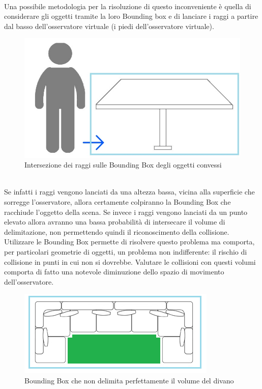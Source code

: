 \\
Una possibile metodologia per la risoluzione di questo inconveniente è quella di considerare gli oggetti tramite la loro Bounding box e di lanciare i raggi a partire dal basso dell’osservatore virtuale (i piedi dell’osservatore virtuale).
\begin{figure}[htb]
 \centering
 \includegraphics[width=0.6\linewidth]{images/chapter_navigazione_scena/collision_tav2.jpg}\hfill
 \caption[Raggi sulle Bounding Box.]{Intersezione dei raggi sulle Bounding Box degli oggetti convessi}
 \label{fig:navigazione_scena_collision_tav2}
\end{figure}
\\
Se infatti i raggi vengono lanciati da una altezza bassa, vicina alla superficie che sorregge l’osservatore, allora certamente colpiranno la Bounding Box che racchiude l’oggetto della scena. Se invece i raggi vengono lanciati da un punto elevato allora avranno una bassa probabilità di intersecare il volume di delimitazione, non permettendo quindi il riconoscimento della collisione.
\\
Utilizzare le Bounding Box permette di risolvere questo problema ma comporta, per particolari geometrie di oggetti, un problema non indifferente: il rischio di collisione in punti in cui non si dovrebbe. Valutare le collisioni con questi volumi comporta di fatto una notevole diminuzione dello spazio di movimento dell’osservatore.
\begin{figure}[htb]
 \centering
 \includegraphics[width=0.7\linewidth]{images/chapter_navigazione_scena/divano.png}\hfill
 \caption[Problemi utilizzo Bounding Box.]{Bounding Box che non delimita perfettamente il volume del divano}
 \label{fig:navigazione_scena_divano}
\end{figure}
